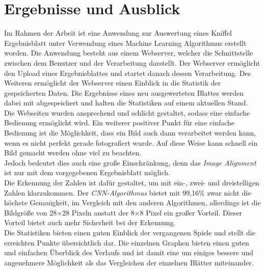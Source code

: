 \chapter{Ergebnisse und Ausblick} \label{cha:results}
Im Rahmen der Arbeit ist eine Anwendung zur Auswertung eines Kniffel Ergebnisblatt unter Verwendung eines Machine Learning Algorithmus erstellt worden. Die Anwendung besteht aus einem Webserver, welcher die Schnittstelle zwischen dem Benutzer und der Verarbeitung darstellt. Der Webserver ermöglicht den Upload eines Ergebnisblattes und startet danach dessen Verarbeitung. Des Weiteren ermöglicht der Webserver einen Einblick in die Statistik der gespeicherten Daten. Die Ergebnisse eines neu ausgewerteten Blattes werden dabei mit abgespeichert und halten die Statistiken auf einem aktuellen Stand.\\\hfill
Die Webseiten wurden ansprechend und schlicht gestaltet, sodass eine einfache Bedienung ermöglicht wird. Ein weiterer positiver Punkt für eine einfache Bedienung ist die Möglichkeit, dass ein Bild auch dann verarbeitet werden kann, wenn es nicht perfekt gerade fotografiert wurde. Auf diese Weise kann schnell ein Bild gemacht werden ohne viel zu beachten.\\\hfill
Jedoch bedeutet dies auch eine große Einschränkung, denn das \textit{Image Alignment} ist nur mit dem vorgegebenen Ergebnisblatt möglich.\\\hfill
Die Erkennung der Zahlen ist dafür gestaltet, um mit ein-, zwei- und dreistelligen Zahlen klarzukommen. Der \textit{CNN-Algorithmus} bietet mit 99,16\% zwar nicht die höchste Genauigkeit, im Vergleich mit den anderen Algorithmen, allerdings ist die Bildgröße von 28×28 Pixeln anstatt der 8×8 Pixel ein großer Vorteil. Dieser Vorteil bietet auch mehr Sicherheit bei der Erkennung.\\\hfill
Die Statistiken bieten einen guten Einblick der vergangenen Spiele und stellt die erreichten Punkte übersichtlich dar. Die einzelnen Graphen bieten einen guten und einfachen Überblick des Verlaufs und ist damit eine um einiges bessere und angenehmere Möglichkeit als das Vergleichen der einzelnen Blätter miteinander.\par

